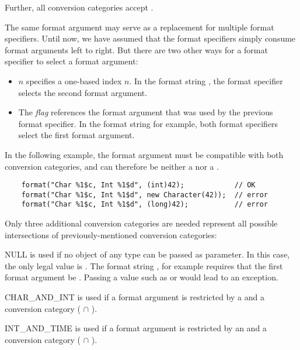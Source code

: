 \noindent Further, all conversion categories accept .

The same format argument may serve as a replacement for multiple format specifiers. 
Until now, we have assumed that the format specifiers simply consume format arguments left to right.
But there are two other ways for a format specifier to select a format argument:

\begin{itemize}
\item $n$\code{\$} specifies a one-based index $n$. In the
    format string , the format specifier selects the
    second format argument.  
\item The \code{<} \emph{flag} references the format argument
    that was used by the previous format specifier. In the format string
     for example, both format specifiers select the first
    format argument.
\end{itemize}

\noindent
In the following example,
the format argument must be compatible with both conversion
categories, and can therefore be neither a  nor a .

\begin{Verbatim}
    format("Char %1$c, Int %1$d", (int)42);            // OK
    format("Char %1$c, Int %1$d", new Character(42));  // error
    format("Char %1$c, Int %1$d", (long)42);           // error
\end{Verbatim}
 
Only three additional conversion categories are needed represent all possible
intersections of previously-mentioned conversion categories:

\begin{description}
\item{NULL} is used if no object of any type can be
    passed as parameter. In this case, the only legal value is .
    The format string , for example requires that the first
    format argument be .  Passing a value such as  or
     would lead to an exception.
\item{CHAR\_AND\_INT} is used if a format argument is restricted by a  and a  conversion category ( $\cap$ ).
\item{INT\_AND\_TIME} is used if a format argument is restricted by an  and a  conversion category ( $\cap$ ).
\end{description}

